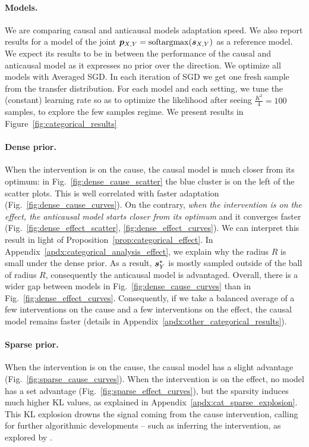 \paragraph{Models.}
We are comparing causal and anticausal models adaptation speed. We also report results for a model of the joint 
${\bm{p}}_{X,Y} = \mathrm{softargmax}({\bm{s}}_{X,Y})$
as a reference model. We expect its results to be in between the performance of the causal and anticausal model as it expresses no prior over the direction. 
We optimize all models with Averaged SGD. In each iteration of SGD we get one fresh sample from the transfer distribution. For each model and each setting, we tune the (constant) learning rate so as to optimize the likelihood after seeing $\frac{K^2}{4}=100$ samples, to explore the few samples regime. 
We present results in Figure~\ref{fig:categorical_results}

\paragraph{Dense prior.}
When the intervention is on the cause, the causal model is much closer from its optimum: in Fig.~\ref{fig:dense_cause_scatter} the blue cluster is on the left of the scatter plots. 
This is well correlated with faster adaptation (Fig.~\ref{fig:dense_cause_curves}). 
On the contrary, \textit{when the intervention is on the effect, the anticausal model starts closer from its optimum} and it converges faster
(Fig.~\ref{fig:dense_effect_scatter}, \ref{fig:dense_effect_curves}).
We can interpret this result in light of Proposition~\ref{prop:categorical_effect}.
In Appendix~\ref{apdx:categorical_analysis_effect}, we explain why the radius $R$ is small under the dense prior.
As a result, ${\bm{s}}_Y^*$ is mostly sampled outside of the ball of radius $R$, consequently the anticausal model is advantaged. 
Overall, there is a wider gap between models in  Fig.~\ref{fig:dense_cause_curves} than in Fig.~\ref{fig:dense_effect_curves}.
Consequently, if we take a balanced average of a few interventions on the cause and a few interventions on the effect, the causal model remains faster (details in Appendix~\ref{apdx:other_categorical_results}).


\paragraph{Sparse prior.}
When the intervention is on the cause, the causal model has a slight advantage (Fig.~\ref{fig:sparse_cause_curves}). 
When the intervention is on the effect, no model has a set advantage (Fig.~\ref{fig:sparse_effect_curves}), but the sparsity induces much higher KL values, as explained in Appendix~\ref{apdx:cat_sparse_explosion}.
This KL explosion drowns the signal coming from the cause intervention, calling for further algorithmic developments -- such as inferring the intervention, as explored by \citet{ke2019learning}.

